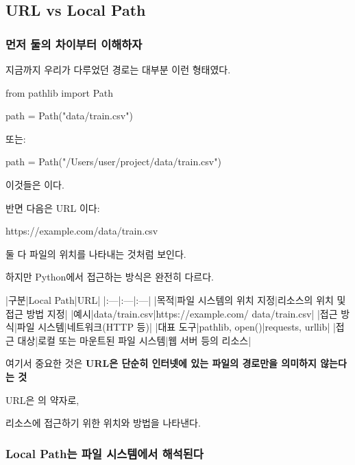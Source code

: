 

\subsection{URL vs Local Path}

\subsubsection{먼저 둘의 차이부터 이해하자}

지금까지 우리가 다루었던 경로는 대부분 이런 형태였다.

\begin{dhkcode}
from pathlib import Path

path = Path("data/train.csv")
\end{dhkcode}

또는:

\begin{dhkcode}
path = Path("/Users/user/project/data/train.csv")
\end{dhkcode}

이것들은 이다.

반면 다음은 URL 이다:

\begin{dhkcode}
https://example.com/data/train.csv
\end{dhkcode}

둘 다 파일의 위치를 나타내는 것처럼 보인다.

하지만 Python에서 접근하는 방식은 완전히 다르다.

\begin{dhktable}
|구분|Local Path|URL|
|:---|:---|:---|
|목적|파일 시스템의 위치 지정|리소스의 위치 및 접근 방법 지정|
|예시|data/train.csv|https://example.com/ data/train.csv|
|접근 방식|파일 시스템|네트워크(HTTP 등)|
|대표 도구|pathlib, open()|requests, urllib|
|접근 대상|로컬 또는 마운트된 파일 시스템|웹 서버 등의 리소스|
\end{dhktable}

여기서 중요한 것은 \textbf{URL은 단순히 인터넷에 있는 파일의 경로만을 의미하지 않는다는 것}

URL은 의 약자로,

리소스에 접근하기 위한 위치와 방법을 나타낸다.

\subsubsection{Local Path는 파일 시스템에서 해석된다}

